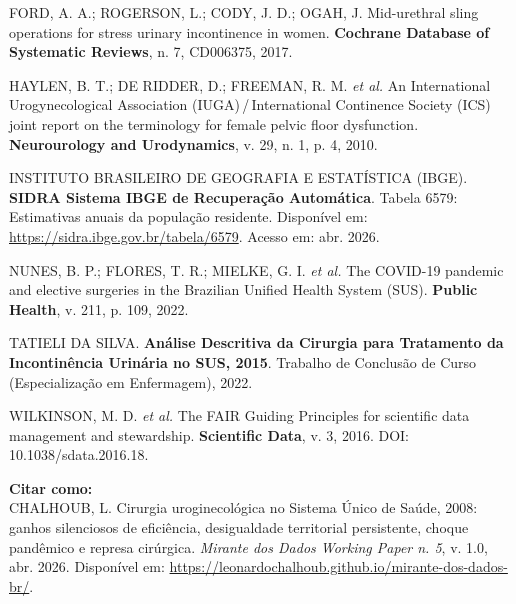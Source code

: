 \documentclass[12pt,a4paper,oneside]{article}
\begin{document}
\begin{singlespace}
\noindent\hangindent=1.25cm
FORD, A. A.; ROGERSON, L.; CODY, J. D.; OGAH, J. Mid-urethral
sling operations for stress urinary incontinence in women.
\textbf{Cochrane Database of Systematic Reviews}, n. 7,
CD006375, 2017.\par\smallskip

\noindent\hangindent=1.25cm
HAYLEN, B. T.; DE RIDDER, D.; FREEMAN, R. M. \textit{et al.}
An International Urogynecological Association
(IUGA)\,/\,International Continence Society (ICS) joint report
on the terminology for female pelvic floor dysfunction.
\textbf{Neurourology and Urodynamics}, v. 29, n. 1,
p. 4, 2010.\par\smallskip

\noindent\hangindent=1.25cm
INSTITUTO BRASILEIRO DE GEOGRAFIA E ESTATÍSTICA (IBGE).
\textbf{SIDRA \textemdash{} Sistema IBGE de Recuperação Automática}.
Tabela 6579: Estimativas anuais da população residente.
Disponível em: \url{https://sidra.ibge.gov.br/tabela/6579}.
Acesso em: abr. 2026.\par\smallskip

\noindent\hangindent=1.25cm
NUNES, B. P.; FLORES, T. R.; MIELKE, G. I. \textit{et al.} The
COVID-19 pandemic and elective surgeries in the Brazilian
Unified Health System (SUS). \textbf{Public Health}, v. 211,
p. 109, 2022.\par\smallskip

\noindent\hangindent=1.25cm
TATIELI DA SILVA. \textbf{Análise Descritiva da Cirurgia para
Tratamento da Incontinência Urinária no SUS, 2015}.
Trabalho de Conclusão de Curso (Especialização em Enfermagem),
2022.\par\smallskip

\noindent\hangindent=1.25cm
WILKINSON, M. D. \textit{et al.} The FAIR Guiding Principles
for scientific data management and stewardship.
\textbf{Scientific Data}, v. 3, 2016.
DOI: 10.1038/sdata.2016.18.\par\smallskip
\end{singlespace}

\vspace{1cm}

\noindent\textbf{Citar como:}\\
CHALHOUB, L. Cirurgia uroginecológica no Sistema Único de Saúde,
2008: ganhos silenciosos de eficiência,
desigualdade territorial persistente, choque pandêmico e represa
cirúrgica. \textit{Mirante dos Dados
\textemdash{} Working Paper n. 5}, v. 1.0, abr. 2026.
Disponível em:
\url{https://leonardochalhoub.github.io/mirante-dos-dados-br/}.
\end{document}
